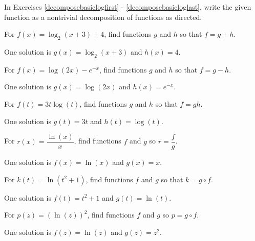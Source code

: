 \documentclass{ximera}
\begin{document}
\begin{question}
In Exercises \ref{decomposebasiclogfirst} - \ref{decomposebasicloglast}, write the given function as a nontrivial decomposition of functions as directed.

\begin{problem}\label{decomposebasiclogfirst}
For $f(x) = \log_{2}(x+3) + 4$, find functions $g$ and $h$ so that $f=g+h$. 

\begin{solution}
    One solution is $g(x) = \log_{2}(x+3)$ and $h(x) = 4$.
\end{solution}
\end{problem}

\begin{problem}
For $f(x) = \log(2x) - e^{-x}$, find functions $g$ and $h$ so that $f=g-h$. 

\begin{solution}
    One solution is $g(x) = \log(2x)$ and $h(x) = e^{-x}$. 
\end{solution}
\end{problem}

\begin{problem}
For $f(t) = 3t \log(t)$, find functions $g$ and $h$ so that $f=gh$.

\begin{solution}
     One solution is $g(t) = 3t$ and $h(t) = \log(t)$.
\end{solution}
\end{problem}

\begin{problem}
For $r(x) = \dfrac{\ln(x)}{x}$, find functions $f$ and $g$ so $r = \dfrac{f}{g}$.

\begin{solution}
    One solution is $f(x) = \ln(x)$ and $g(x)=x$.
\end{solution}
\end{problem}

\begin{problem}
For $k(t) = \ln(t^2+1)$, find functions $f$ and $g$  so that $k = g \circ f$.

\begin{solution}
    One solution is $f(t) = t^2+1$ and $g(t) = \ln(t)$.
\end{solution}
\end{problem}

\begin{problem}\label{decomposebasicloglast}
For $p(z) = (\ln(z))^2$, find functions $f$ and $g$ so $p = g \circ f$. 

\begin{solution}
    One solution is $f(z) = \ln(z)$ and $g(z) = z^2$. 
\end{solution}
\end{problem}
\end{question}
\end{document}
